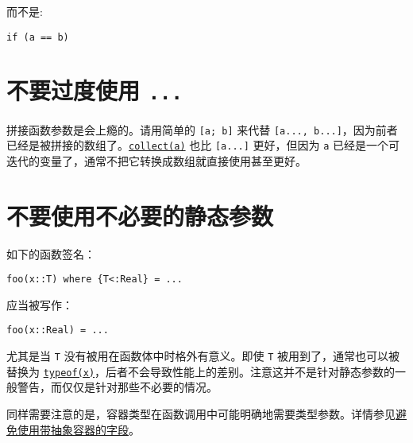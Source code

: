 而不是:




\begin{verbatim}
if (a == b)
\end{verbatim}



\hypertarget{13344988799401234550}{}


\section{不要过度使用 \texttt{...}}



拼接函数参数是会上瘾的。请用简单的 \texttt{[a; b]} 来代替 \texttt{[a..., b...]}，因为前者已经是被拼接的数组了。\hyperlink{6278865767444641812}{\texttt{collect(a)}} 也比 \texttt{[a...]} 更好，但因为 \texttt{a} 已经是一个可迭代的变量了，通常不把它转换成数组就直接使用甚至更好。



\hypertarget{13140702923511466392}{}


\section{不要使用不必要的静态参数}



如下的函数签名：




\begin{verbatim}
foo(x::T) where {T<:Real} = ...
\end{verbatim}



应当被写作：




\begin{verbatim}
foo(x::Real) = ...
\end{verbatim}



尤其是当 \texttt{T} 没有被用在函数体中时格外有意义。即使 \texttt{T} 被用到了，通常也可以被替换为 \hyperlink{13440452181855594120}{\texttt{typeof(x)}}，后者不会导致性能上的差别。注意这并不是针对静态参数的一般警告，而仅仅是针对那些不必要的情况。



同样需要注意的是，容器类型在函数调用中可能明确地需要类型参数。详情参见\hyperlink{11695962945306703148}{避免使用带抽象容器的字段}。



\hypertarget{14321901677948654689}{}



